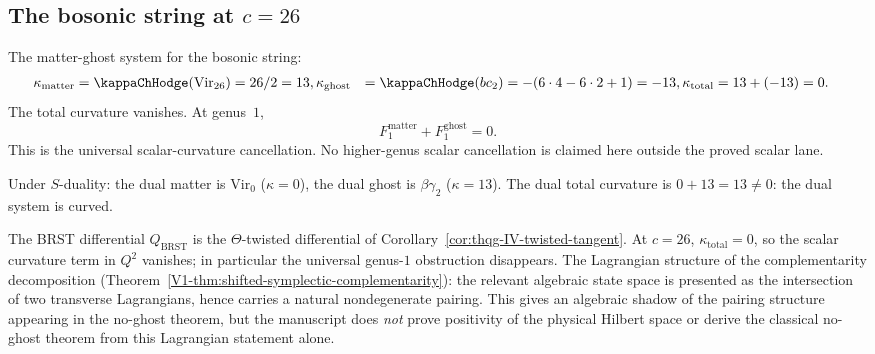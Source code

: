 %
%

\subsection{The bosonic string at \texorpdfstring{$c = 26$}{c = 26}}

\begin{computation}
The matter-ghost system for the bosonic string:
\begin{align}
\kappa_{\mathrm{matter}} &= \kappaChHodge(\mathrm{Vir}_{26})
= 26/2 = 13, %
\kappa_{\mathrm{ghost}} &= \kappaChHodge(bc_2)
= -(6 \cdot 4 - 6 \cdot 2 + 1) = -13, %
\kappa_{\mathrm{total}} &= 13 + (-13) = 0.
\end{align}
The total curvature vanishes. At genus~$1$,
\[
 F_1^{\mathrm{matter}} + F_1^{\mathrm{ghost}} = 0.
\]
This is the universal scalar-curvature cancellation. No
higher-genus scalar cancellation is claimed here outside the proved
scalar lane.

Under $S$-duality: the dual matter is $\mathrm{Vir}_0$ ($\kappa = 0$),
the dual ghost is $\beta\gamma_2$ ($\kappa = 13$). The dual total
curvature is $0 + 13 = 13 \neq 0$: the dual system is curved.
\end{computation}

\begin{remark}
\label{rem:thqg-IV-no-ghost}
The BRST differential $Q_{\mathrm{BRST}}$ is the $\Theta$-twisted
differential of Corollary~\ref{cor:thqg-IV-twisted-tangent}.
At $c = 26$, $\kappa_{\mathrm{total}} = 0$, so the scalar curvature
term in $Q^2$ vanishes; in particular the universal genus-$1$
obstruction disappears. The Lagrangian
structure of the complementarity decomposition
(Theorem~\ref{V1-thm:shifted-symplectic-complementarity}): the
relevant algebraic state space is presented as the intersection of two
transverse Lagrangians, hence carries a natural nondegenerate pairing.
This gives an algebraic shadow of the pairing structure appearing in the
no-ghost theorem, but the manuscript does \emph{not} prove positivity of
the physical Hilbert space or derive the classical no-ghost theorem from
this Lagrangian statement alone.
\end{remark}

